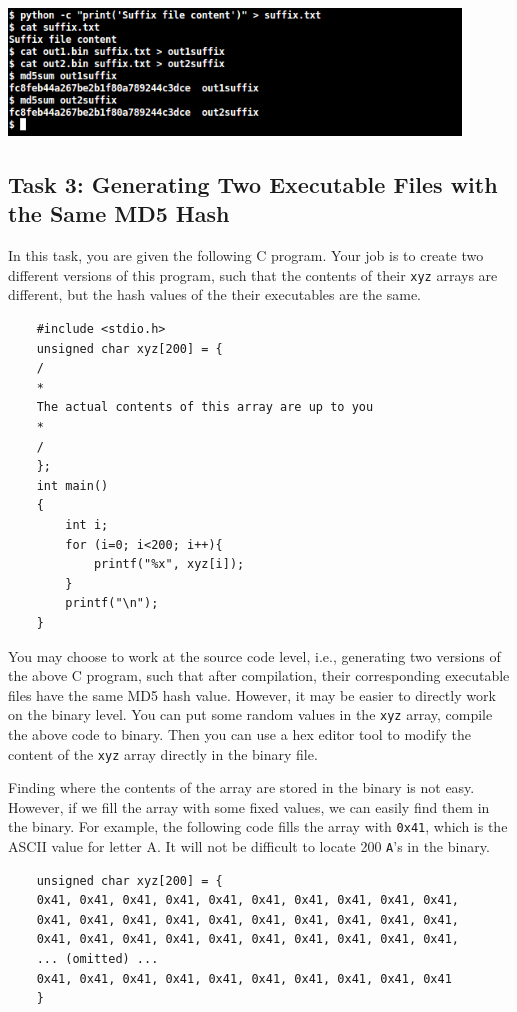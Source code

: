 \documentclass[a4paper]{article}
\begin{document}
\bigskip

\includegraphics[width=0.9\textwidth]{bash/md5suffix.png}

\bigskip

\subsection{Task 3: Generating Two Executable Files with the Same MD5 Hash}

In this task, you are given the following C program. Your job is to create two different versions of this program, such that the contents of their \texttt{xyz} arrays are different, but the hash values of the their executables are the same.

\begin{verbatim}
    #include <stdio.h>
    unsigned char xyz[200] = {
    /
    *
    The actual contents of this array are up to you
    *
    /
    };
    int main()
    {
        int i;
        for (i=0; i<200; i++){
            printf("%x", xyz[i]);
        }
        printf("\n");
    }
\end{verbatim}

You may choose to work at the source code level, i.e., generating two versions of the above C program, such that after compilation, their corresponding executable files have the same MD5 hash value. However, it may be easier to directly work on the binary level. You can put some random values in the \texttt{xyz} array, compile the above code to binary. Then you can use a hex editor tool to modify the content of the \texttt{xyz} array directly in the binary file.

Finding where the contents of the array are stored in the binary is not easy. However, if we fill the array with some fixed values, we can easily find them in the binary. For example, the following code fills the array with \texttt{0x41}, which is the ASCII value for letter A. It will not be difficult to locate 200 \texttt{A}’s in the binary.

\begin{verbatim}
    unsigned char xyz[200] = {
    0x41, 0x41, 0x41, 0x41, 0x41, 0x41, 0x41, 0x41, 0x41, 0x41,
    0x41, 0x41, 0x41, 0x41, 0x41, 0x41, 0x41, 0x41, 0x41, 0x41,
    0x41, 0x41, 0x41, 0x41, 0x41, 0x41, 0x41, 0x41, 0x41, 0x41,
    ... (omitted) ...
    0x41, 0x41, 0x41, 0x41, 0x41, 0x41, 0x41, 0x41, 0x41, 0x41
    }
\end{verbatim}
\end{document}
